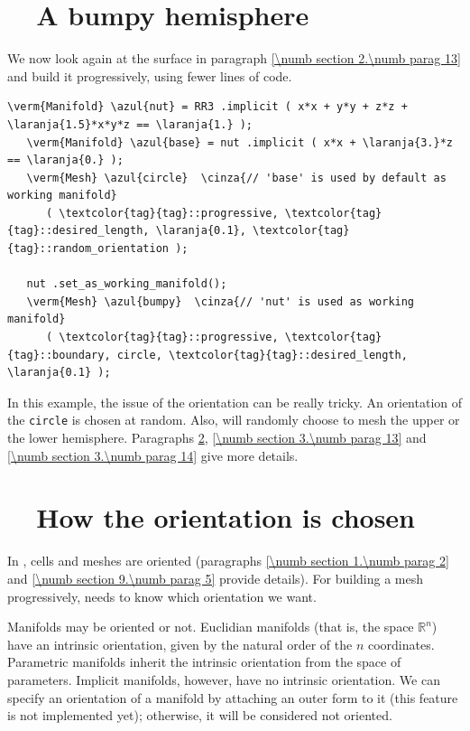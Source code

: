 \section{~~A bumpy hemisphere}\label{\numb section 3.\numb parag 9}

We now look again at the surface in paragraph \ref{\numb section 2.\numb parag 13}
and build it progressively, using fewer lines of code.

\begin{Verbatim}[commandchars=\\\{\},formatcom=\small\tt,
   baselinestretch=0.94,framesep=2mm                      ]
   \verm{Manifold} \azul{nut} = RR3 .implicit ( x*x + y*y + z*z + \laranja{1.5}*x*y*z == \laranja{1.} );
   \verm{Manifold} \azul{base} = nut .implicit ( x*x + \laranja{3.}*z == \laranja{0.} );
   \verm{Mesh} \azul{circle}  \cinza{// 'base' is used by default as working manifold}
      ( \textcolor{tag}{tag}::progressive, \textcolor{tag}{tag}::desired_length, \laranja{0.1}, \textcolor{tag}{tag}::random_orientation );
   
   nut .set_as_working_manifold();
   \verm{Mesh} \azul{bumpy}  \cinza{// 'nut' is used as working manifold}
      ( \textcolor{tag}{tag}::progressive, \textcolor{tag}{tag}::boundary, circle, \textcolor{tag}{tag}::desired_length, \laranja{0.1} );
\end{Verbatim}

In this example, the issue of the orientation can be really tricky.
An orientation of the {\small\tt circle} is chosen at random.
Also, {\maniFEM} will randomly choose to mesh the upper or the lower hemisphere.
Paragraphs \ref{\numb section 3.\numb parag 10}, \ref{\numb section 3.\numb parag 13} and
\ref{\numb section 3.\numb parag 14} give more details.


\section{~~How the orientation is chosen}\label{\numb section 3.\numb parag 10}

In \maniFEM, cells and meshes are oriented (paragraphs \ref{\numb section 1.\numb parag 2}
and \ref{\numb section 9.\numb parag 5} provide details).
For building a mesh progressively, {\maniFEM} needs to know which orientation we want.

Manifolds may be oriented or not.
Euclidian manifolds (that is, the space $ \mathbb{R}^n $) have an intrinsic orientation,
given by the natural order of the $n$ coordinates.
Parametric manifolds inherit the intrinsic orientation from the space of parameters.
Implicit manifolds, however, have no intrinsic orientation.
We can specify an orientation of a manifold by attaching an outer form to it
(this feature is not implemented yet); otherwise, it will be considered not oriented.

